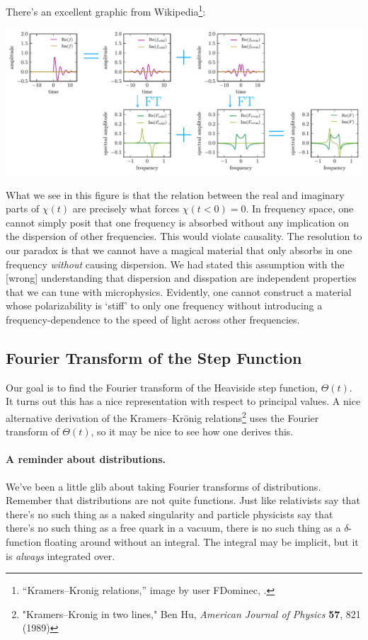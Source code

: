 There's an excellent graphic from Wikipedia\footnote{``Kramers--Kronig relations,'' image by user FDominec, .}:
\begin{center}
\includegraphics[width=.9\textwidth]{figures/Kramers_05_Fdominec.pdf}
\end{center}
What we see in this figure is that the relation between the real and imaginary parts of $\chi(t)$ are precisely what forces $\chi(t<0) = 0$. In frequency space, one cannot simply posit that one frequency is absorbed without any implication on the dispersion of other frequencies. This would violate causality. The resolution to our paradox is that we cannot have a magical material that only absorbs in one frequency \emph{without} causing dispersion. We had stated this assumption with the [wrong] understanding that dispersion and disspation are independent properties that we can tune with microphysics. Evidently, one cannot construct a material whose polarizability is `stiff' to only one frequency without introducing a frequency-dependence to the speed of light across other frequencies.


\subsection{Fourier Transform of the Step Function}

Our goal is to find the Fourier transform of the Heaviside step function, $\Theta(t)$. It turns out this has a nice representation with respect to principal values. A nice alternative derivation of the Kramers--Kr\"onig relations\footnote{"Kramers–Kronig in two lines," Ben Hu, \emph{American Journal of Physics} \textbf{57}, 821 (1989)} uses the Fourier transform of $\Theta(t)$, so it may be nice to see how one derives this.

\paragraph{A reminder about distributions.}
We've been a little glib about taking Fourier transforms of distributions. Remember that {distributions} are not quite functions. Just like relativists say that there's no such thing as a naked singularity and particle physicists say that there's no such thing as a free quark in a vacuum, there is no such thing as a $\delta$-function floating around without an integral. The integral may be implicit, but it is \emph{always} integrated over. 



